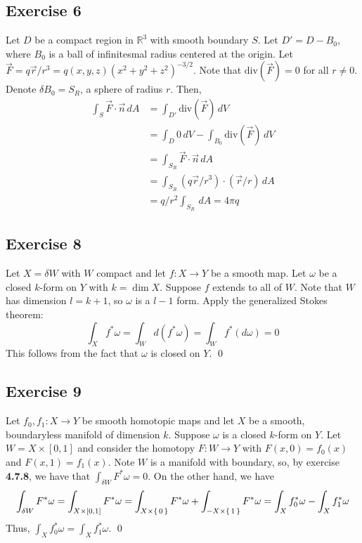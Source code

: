 \documentclass{article}
\newcommand{\R}{\mathbb{R}}
\begin{document}
  \subsection*{Exercise 6}
    Let $D$ be a compact region in $\R^3$ with smooth boundary $S$. Let $D'=D-
    B_0$, where $B_0$ is a ball of infinitesmal radius centered at the origin.
    Let $\vec{F}=q\vec{r}/r^3=q(x,y,z)(x^2+y^2+z^2)^{-3/2}$. Note that
    $\text{div}(\vec{F})=0$ for all $r\ne0$. Denote $\delta B_0=S_R$, a sphere
    of radius $r$. Then,
    \begin{align*}
      \int_S \vec{F}\cdot\vec{n}\,dA
        &= \int_{D'}\text{div}(\vec{F})\,dV\\
        &= \int_D 0\,dV - \int_{B_0} \text{div}(\vec{F})\,dV\\
        &= \int_{S_R}\vec{F}\cdot\vec{n}\,dA\\
        &= \int_{S_R} (q\vec{r}/r^3)\cdot(\vec{r}/r)\,dA\\
        &= q/r^2\int_{S_R}\,dA=4\pi q
        \tag*{\qed}
    \end{align*}

  \subsection*{Exercise 8}
    Let $X=\delta W$ with $W$ compact and let $f\colon X\to Y$ be a smooth map.
    Let $\omega$ be a closed $k$-form on $Y$ with $k=\dim X$. Suppose $f$
    extends to all of $W$. Note that $W$ has dimension $l=k+1$, so $\omega$ is a
    $l-1$ form. Apply the generalized Stokes theorem:
    \begin{equation*}
      \int_X f^*\omega
        = \int_{W} d(f^*\omega)
        = \int_{W} f^*(d\omega)
        = 0
    \end{equation*}
    This follows from the fact that $\omega$ is closed on $Y$.
    \qed

  \subsection*{Exercise 9}
    Let $f_0,f_1\colon X\to Y$ be smooth homotopic maps and let $X$ be a smooth,
    boundaryless manifold of dimension $k$. Suppose $\omega$ is a closed
    $k$-form on $Y$. Let $W=X\times[0,1]$ and consider the homotopy $F\colon W
    \to Y$ with $F(x,0)=f_0(x)$ and $F(x,1)=f_1(x)$. Note $W$ is a manifold with
    boundary, so, by exercise \textbf{4.7.8}, we have that $\int_{\delta W}F^*
    \omega=0$. On the other hand, we have
    \begin{equation*}
      \int_{\delta W}F^*\omega
        =\int_{X\times[0,1]}F^*\omega
        =\int_{X\times\set{0}}F^*\omega + \int_{-X\times\set{1}}F^*\omega
        =\int_{X}f_0^*\omega-\int_{X}f_1^*\omega
    \end{equation*}
    Thus, $\int_Xf_0^*\omega=\int_Xf_1^*\omega$.
    \qed
\end{document}
